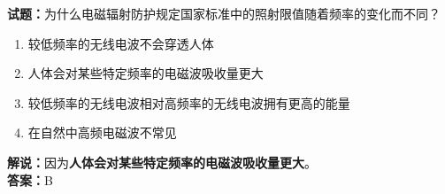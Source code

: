 \documentclass{ctexbook}
\begin{document}
\bigskip

\noindent\textbf{试题：}为什么电磁辐射防护规定国家标准中的照射限值随着频率的变化而不同？
\begin{enumerate}[leftmargin=3em]
  \item 较低频率的无线电波不会穿透人体
  \item 人体会对某些特定频率的电磁波吸收量更大
  \item 较低频率的无线电波相对高频率的无线电波拥有更高的能量
  \item 在自然中高频电磁波不常见
\end{enumerate}
\noindent\textbf{解说：}因为\textbf{人体会对某些特定频率的电磁波吸收量更大}。\\
\textbf{答案：}B









\end{document}

